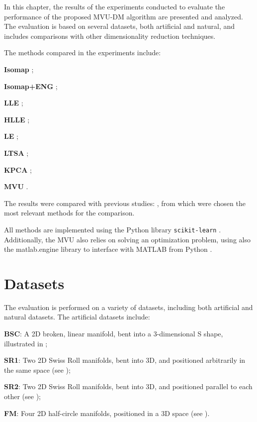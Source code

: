 \label{chap:Results}


In this chapter, the results of the experiments conducted to evaluate the performance of the proposed MVU-DM algorithm are presented and analyzed. The evaluation is based on several datasets, both artificial and natural, and includes comparisons with other dimensionality reduction techniques.

The methods compared in the experiments include:
\begin{inparaenum}
    \item \textbf{\ac{Isomap}} \cite{isomap};
    \item \textbf{\ac{Isomap}+\ac{ENG}} \cite{isomap, eng};
    \item \textbf{\ac{LLE}} \cite{lle};
    \item \textbf{\ac{HLLE}} \cite{hlle};
    \item \textbf{\ac{LE}} \cite{le};
    \item \textbf{\ac{LTSA}} \cite{ltsa};
    \item \textbf{\ac{KPCA}} \cite{kpca};
    \item \textbf{\ac{MVU}} \cite{mvu}.
\end{inparaenum}

The results were compared with previous studies: \cite{comparison} \cite{eng}, from which were chosen the most relevant methods for the comparison.

All methods are implemented using the Python \cite{python} library \texttt{scikit-learn} \cite{scikit-learn}. Additionally, the \ac{MVU} also relies on solving an optimization problem, using also the matlab.engine library to interface with MATLAB from Python \cite{matlab.python, python}.


\section{Datasets}
    The evaluation is performed on a variety of datasets, including both artificial and natural datasets. The artificial datasets include:
    \begin{inparaenum}
        \item \textbf{\ac{BSC}}: A 2D broken, linear manifold, bent into a 3-dimensional S shape, illustrated in ;
        \item \textbf{\ac{SR1}}: Two 2D Swiss Roll manifolds, bent into 3D, and positioned arbitrarily in the same space (see );
        \item \textbf{\ac{SR2}}: Two 2D Swiss Roll manifolds, bent into 3D, and positioned parallel to each other (see );
        \item \textbf{\ac{FM}}: Four 2D half-circle manifolds, positioned in a 3D space (see ).
    \end{inparaenum}


